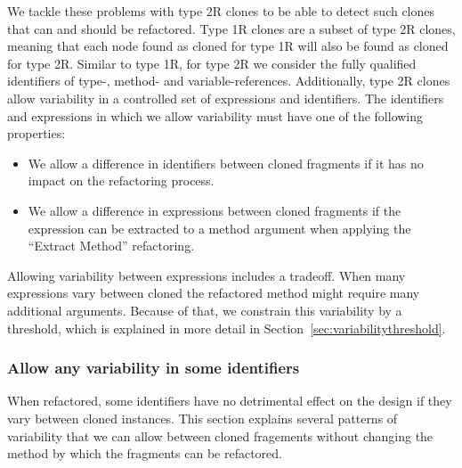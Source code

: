 We tackle these problems with type 2R clones to be able to detect such clones that can and should be refactored. Type 1R clones are a subset of type 2R clones, meaning that each node found as cloned for type 1R will also be found as cloned for type 2R. Similar to type 1R, for type 2R we consider the fully qualified identifiers of type-, method- and variable-references. Additionally, type 2R clones allow variability in a controlled set of expressions and identifiers. The identifiers and expressions in which we allow variability must have one of the following properties:
\begin{itemize}
  \item We allow a difference in identifiers between cloned fragments if it has no impact on the refactoring process.
  \item We allow a difference in expressions between cloned fragments if the expression can be extracted to a method argument when applying the ``Extract Method'' refactoring.
\end{itemize}

Allowing variability between expressions includes a tradeoff. When many expressions vary between cloned the refactored method might require many additional arguments. Because of that, we constrain this variability by a threshold, which is explained in more detail in Section~\ref{sec:variabilitythreshold}.%

\subsubsection{Allow any variability in some identifiers}
When refactored, some identifiers have no detrimental effect on the design if they vary between cloned instances. This section explains several patterns of variability that we can allow between cloned fragements without changing the method by which the fragments can be refactored.

